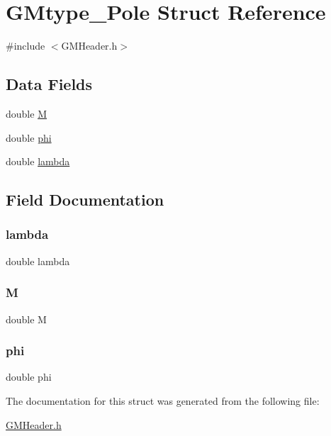\hypertarget{struct_g_mtype___pole}{}\section{G\+Mtype\+\_\+\+Pole Struct Reference}
\label{struct_g_mtype___pole}


{\ttfamily \#include $<$G\+M\+Header.\+h$>$}

\subsection*{Data Fields}
\begin{DoxyCompactItemize}
\item 
double \mbox{\hyperlink{struct_g_mtype___pole_abb04f5f017f41f350a3d81fecdbfa762}{M}}
\item 
double \mbox{\hyperlink{struct_g_mtype___pole_adae8d8a6ff28515e505bb1c07f2b33c8}{phi}}
\item 
double \mbox{\hyperlink{struct_g_mtype___pole_a3db359547eed8cfd48ca821d95f577af}{lambda}}
\end{DoxyCompactItemize}


\subsection{Field Documentation}
\mbox{\label{struct_g_mtype___pole_a3db359547eed8cfd48ca821d95f577af}} 
\subsubsection{\texorpdfstring{lambda}{lambda}}
{\footnotesize\ttfamily double lambda}

\mbox{\label{struct_g_mtype___pole_abb04f5f017f41f350a3d81fecdbfa762}} 
\subsubsection{\texorpdfstring{M}{M}}
{\footnotesize\ttfamily double M}

\mbox{\label{struct_g_mtype___pole_adae8d8a6ff28515e505bb1c07f2b33c8}} 
\subsubsection{\texorpdfstring{phi}{phi}}
{\footnotesize\ttfamily double phi}



The documentation for this struct was generated from the following file\+:\begin{DoxyCompactItemize}
\item 
\mbox{\hyperlink{_g_m_header_8h}{G\+M\+Header.\+h}}\end{DoxyCompactItemize}
